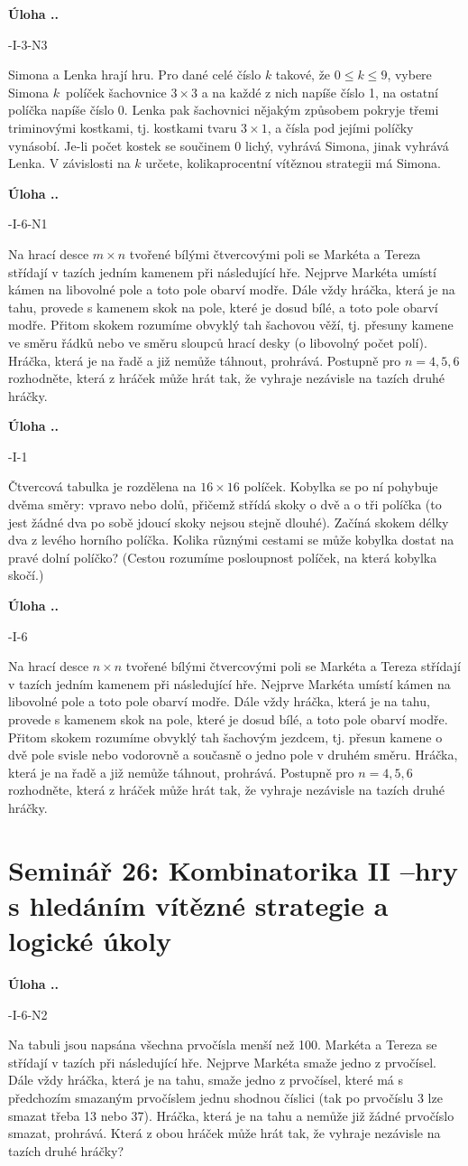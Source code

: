 \documentclass{article}
\newcounter{seminar}
\newcounter{problem}
\newcommand{\seminar}[2]{
  \clearpage
  \setcounter{seminar}{#1}
  \setcounter{problem}{0}
  \section*{Seminář #1: #2}
}
\newcommand{\source}[1]{
  \def\temp{#1}\ifx\temp\empty
  \else
    [#1]
  \fi
}
\newcommand{\problem}[3]{
  \stepcounter{problem}
  \noindent\textbf{Úloha \theseminar .\theproblem.}
    \source{#1} #2
  \bigskip
}
\begin{document}
\problem{64-I-3-N3}{
Simona a Lenka hrají hru. Pro dané celé číslo $k$ takové, že $0 \leq k \leq 9$, vybere Simona $k$~políček šachovnice $3 \times 3$ a na každé z nich napíše číslo 1, na ostatní políčka napíše číslo 0. Lenka pak šachovnici nějakým způsobem pokryje třemi triminovými kostkami, tj. kostkami tvaru $3 \times 1$, a čísla pod jejími políčky vynásobí. Je-li počet kostek se součinem 0 lichý, vyhrává Simona, jinak vyhrává Lenka. V závislosti na $k$ určete, kolikaprocentní vítěznou strategii má Simona.
}{
}

\problem{61-I-6-N1}{
Na hrací desce $m \times n$ tvořené bílými čtvercovými poli se Markéta a Tereza střídají v tazích jedním kamenem při následující hře. Nejprve Markéta umístí kámen na libovolné pole a toto pole obarví modře. Dále vždy hráčka, která je na tahu, provede s kamenem skok na pole, které je dosud bílé, a toto pole obarví modře. Přitom skokem rozumíme obvyklý tah šachovou věží, tj. přesuny kamene ve směru řádků nebo ve směru sloupců hrací desky (o libovolný počet polí). Hráčka, která je na řadě a již nemůže táhnout, prohrává. Postupně pro $n = 4, 5, 6$ rozhodněte, která z hráček může hrát tak, že vyhraje nezávisle na tazích druhé hráčky.
}{
}

\problem{62-I-1}{
Čtvercová tabulka je rozdělena na $16 \times 16$ políček. Kobylka se po ní pohybuje dvěma směry: vpravo nebo dolů, přičemž střídá skoky o dvě a o tři políčka (to jest žádné dva po sobě jdoucí skoky nejsou stejně dlouhé). Začíná skokem délky dva z levého horního políčka. Kolika různými cestami se může kobylka dostat na pravé dolní políčko? (Cestou rozumíme posloupnost políček, na která kobylka skočí.)
}{
}

\problem{61-I-6}{
Na hrací desce $n \times n$ tvořené bílými čtvercovými poli se Markéta a Tereza střídají v tazích jedním kamenem při následující hře. Nejprve Markéta umístí kámen na libovolné pole a toto pole obarví modře. Dále vždy hráčka, která je na tahu, provede s kamenem skok na pole, které je dosud bílé, a toto pole obarví modře. Přitom skokem rozumíme obvyklý tah šachovým jezdcem, tj. přesun kamene o dvě pole svisle nebo vodorovně a současně o jedno pole v druhém směru. Hráčka, která je na řadě a již nemůže táhnout, prohrává. Postupně pro $n = 4, 5, 6$ rozhodněte, která z hráček může hrát tak, že vyhraje nezávisle na tazích druhé hráčky.
}{
}


\seminar{26}{Kombinatorika II --hry s hledáním vítězné strategie a logické úkoly}

\problem{61-I-6-N2}{
Na tabuli jsou napsána všechna prvočísla menší než 100. Markéta a Tereza se střídají v tazích při následující hře. Nejprve Markéta smaže jedno z prvočísel. Dále vždy hráčka, která je na tahu, smaže jedno z prvočísel, které má s předchozím smazaným prvočíslem jednu shodnou číslici (tak po prvočíslu 3 lze smazat třeba 13 nebo 37). Hráčka, která je na tahu a nemůže již žádné prvočíslo smazat, prohrává. Která z obou hráček může hrát
tak, že vyhraje nezávisle na tazích druhé hráčky?
}{
}
\end{document}
